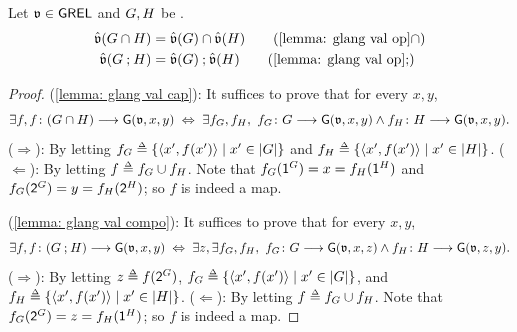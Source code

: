 \begin{proposition}\label{lemma: glang val op}
       Let $\mathfrak{v} \in \mathsf{GREL}$ and $\graph[1], \graph[2]$ be .
       \begin{align*}
              \label{lemma: glang val cap} \hat{\val}(\graph[1] \cap \graph[2])     & = \hat{\val}(\graph[1]) \cap \hat{\val}(\graph[2]) \tag{\Cref{lemma: glang val op}$\cap$}     \\
              \label{lemma: glang val compo} \hat{\val}(\graph[1] \compo \graph[2]) & = \hat{\val}(\graph[1]) \rcompo \hat{\val}(\graph[2]) \tag{\Cref{lemma: glang val op}$\compo$}
       \end{align*}
\end{proposition}
\begin{proof}
       (\ref{lemma: glang val cap}):
       It suffices to prove that for every $x, y$,
       \[\exists f, f \colon (\graph[1] \cap \graph[2]) \homo \const{\graph}(\val, x, y) \;\Leftrightarrow\; \exists f_{\graph[1]}, f_{\graph[2]},\  f_{\graph[1]} \colon \graph[1] \homo \const{\graph}(\val, x, y) \land f_{\graph[2]} \colon \graph[2] \homo \const{\graph}(\val, x, y).\]
       ($\Rightarrow$):
       By letting $f_{\graph[1]} \defeq \set{\tuple{x', f(x')} \mid x' \in |\graph[1]|}$ and $f_{\graph[2]} \defeq \set{\tuple{x', f(x')} \mid x' \in |H|}$.
       ($\Leftarrow$):
       By letting $f \defeq f_{\graph[1]} \cup f_{\graph[2]}$.
       Note that $f_{\graph[1]}(\src^{\graph[1]}) = x = f_{\graph[2]}(\src^{\graph[2]})$ and $f_{\graph[1]}(\tgt^{\graph[1]}) = y = f_{\graph[2]}(\tgt^{\graph[2]})$; so $f$ is indeed a map.

       (\ref{lemma: glang val compo}):
       It suffices to prove that for every $x, y$,
       \[\exists f, f \colon (\graph[1] \compo \graph[2]) \homo \const{\graph}(\val, x, y) \;\Leftrightarrow\; \exists z, \exists f_{\graph[1]}, f_{\graph[2]},\  f_{\graph[1]} \colon \graph[1] \homo \const{\graph}(\val, x, z) \land f_{\graph[2]} \colon \graph[2] \homo \const{\graph}(\val, z, y).\]
       ($\Rightarrow$):
       By letting $z \defeq f(\tgt^{\graph[1]})$, $f_{\graph[1]} \defeq \set{\tuple{x', f(x')} \mid x' \in |\graph[1]|}$, and $f_{\graph[2]} \defeq \set{\tuple{x', f(x')} \mid x' \in |\graph[2]|}$.
       ($\Leftarrow$):
       By letting $f \defeq f_{\graph[1]} \cup f_{\graph[2]}$.
       Note that $f_{\graph[1]}(\tgt^{\graph[1]}) = z = f_{\graph[2]}(\src^{\graph[2]})$; so $f$ is indeed a map.
\end{proof}

